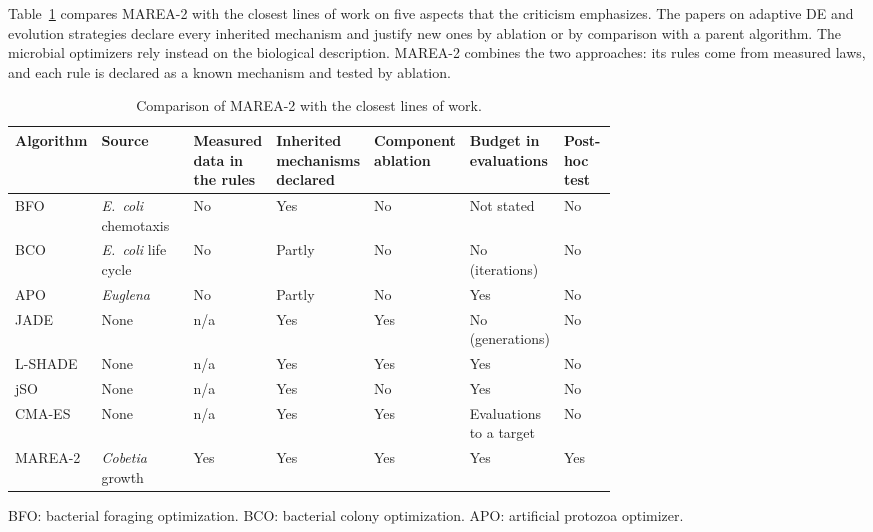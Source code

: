 \documentclass[preprint,12pt]{elsarticle}
\begin{document}
Table~\ref{tab:related} compares MAREA-2 with the closest lines of work on five
aspects that the criticism emphasizes. The papers on adaptive DE and evolution
strategies declare every inherited mechanism and justify new ones by ablation
or by comparison with a parent algorithm. The microbial optimizers rely
instead on the biological description. MAREA-2 combines the two approaches: its
rules come from measured laws, and each rule is declared as a known mechanism
and tested by ablation.

\begin{table}[t]
  \centering
  \caption{Comparison of MAREA-2 with the closest lines of work.}
  \label{tab:related}
  \footnotesize
  \begin{tabular}{l>{\raggedright\arraybackslash}p{0.16\linewidth}
                  >{\raggedright\arraybackslash}p{0.11\linewidth}
                  >{\raggedright\arraybackslash}p{0.11\linewidth}
                  >{\raggedright\arraybackslash}p{0.1\linewidth}
                  >{\raggedright\arraybackslash}p{0.13\linewidth}
                  >{\raggedright\arraybackslash}p{0.09\linewidth}}
    \toprule
    Algorithm & Source & Measured data in the rules & Inherited mechanisms declared
      & Component ablation & Budget in evaluations & Post-hoc test \\
    \midrule
    BFO~\cite{passino2002bfo} & \emph{E.~coli} chemotaxis & No & Yes & No & Not stated & No \\
    BCO~\cite{niu2012bco} & \emph{E.~coli} life cycle & No & Partly & No & No (iterations) & No \\
    APO~\cite{wang2024apo} & \emph{Euglena} & No & Partly & No & Yes & No \\
    JADE~\cite{zhang2009jade} & None & n/a & Yes & Yes & No (generations) & No \\
    L-SHADE~\cite{tanabe2014lshade} & None & n/a & Yes & Yes & Yes & No \\
    jSO~\cite{brest2017jso} & None & n/a & Yes & No & Yes & No \\
    CMA-ES~\cite{hansen2001cmaes} & None & n/a & Yes & Yes & Evaluations to a target & No \\
    MAREA-2 & \emph{Cobetia} growth & Yes & Yes & Yes & Yes & Yes \\
    \bottomrule
  \end{tabular}
  \par\smallskip\footnotesize BFO: bacterial foraging optimization. BCO:
  bacterial colony optimization. APO: artificial protozoa optimizer.
\end{table}
\end{document}
